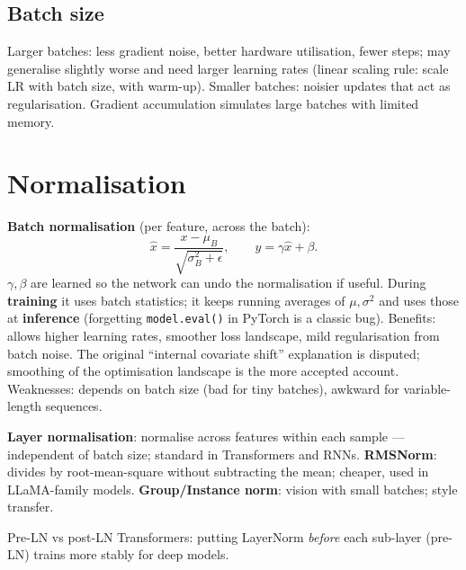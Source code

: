\subsection{Batch size}
Larger batches: less gradient noise, better hardware utilisation, fewer steps; may generalise slightly worse and need larger learning rates (linear scaling rule: scale LR with batch size, with warm-up). Smaller batches: noisier updates that act as regularisation. Gradient accumulation simulates large batches with limited memory.

\section{Normalisation}
\textbf{Batch normalisation} (per feature, across the batch):
\[\hat x=\frac{x-\mu_B}{\sqrt{\sigma_B^2+\epsilon}},\qquad y=\gamma\hat x+\beta.\]
$\gamma,\beta$ are learned so the network can undo the normalisation if useful. During \textbf{training} it uses batch statistics; it keeps running averages of $\mu,\sigma^2$ and uses those at \textbf{inference} (forgetting \texttt{model.eval()} in PyTorch is a classic bug). Benefits: allows higher learning rates, smoother loss landscape, mild regularisation from batch noise. The original ``internal covariate shift'' explanation is disputed; smoothing of the optimisation landscape is the more accepted account. Weaknesses: depends on batch size (bad for tiny batches), awkward for variable-length sequences.

\textbf{Layer normalisation}: normalise across features within each sample --- independent of batch size; standard in Transformers and RNNs. \textbf{RMSNorm}: divides by root-mean-square without subtracting the mean; cheaper, used in LLaMA-family models. \textbf{Group/Instance norm}: vision with small batches; style transfer.

Pre-LN vs post-LN Transformers: putting LayerNorm \emph{before} each sub-layer (pre-LN) trains more stably for deep models.

